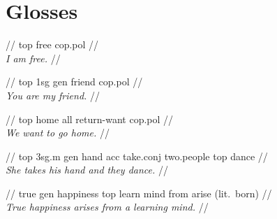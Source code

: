 \documentclass{article}
\begin{document}
\newpage\section{Glosses}

\ex
\begingl
\gla {}    //
 {\sc top} free {\sc cop.pol} //
\\\textit{I am free.} //
\endgl
\xe

\ex
\begingl
\gla {}      //
 {\sc top} {\sc 1sg} {\sc gen} friend {\sc cop.pol} //
\\\textit{You are my friend.} //
\endgl
\xe

\ex
\begingl
\gla {}      //
 {\sc top} home {\sc all} return-want {\sc cop.pol} //
\\\textit{We want to go home.} //
\endgl
\xe

\ex
\begingl
\gla {}          //
 {\sc top} {\sc 3sg.m} {\sc gen} hand {\sc acc} take.{\sc conj} two.people {\sc top} dance //
\\\textit{She takes his hand and they dance.} //
\endgl
\xe

\ex
\begingl
\gla {}        //
\glb true {\sc gen} happiness {\sc top} learn mind from {arise (lit.\ born)} //
\\\textit{True happiness arises from a learning mind.} //
\endgl
\xe
\end{document}
